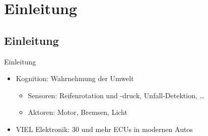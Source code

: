 \section{Einleitung}

\subsection{Einleitung}


\begin{frame}{Einleitung}
    \begin{itemize}[<+->]
        \item Kognition: Wahrnehmung der Umwelt
        \begin{itemize}
            \item Sensoren: Reifenrotation und -druck, Unfall-Detektion, \dots
            \item Aktoren: Motor, Bremsen, Licht
        \end{itemize}
        \item VIEL Elektronik: 30 und mehr ECUs in modernen Autos
    \end{itemize}
\end{frame}